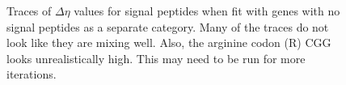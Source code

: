 \documentclass[11pt]{labbook}
\begin{document}
\begin{figure}
\caption{Traces of $\Delta\eta$ values for signal peptides when fit with genes with no signal peptides as a separate category. Many of the traces do not look like they are mixing well. Also, the arginine codon (R) CGG looks unrealistically high. This may need to be run for more iterations.}
\end{figure}
\end{document}

